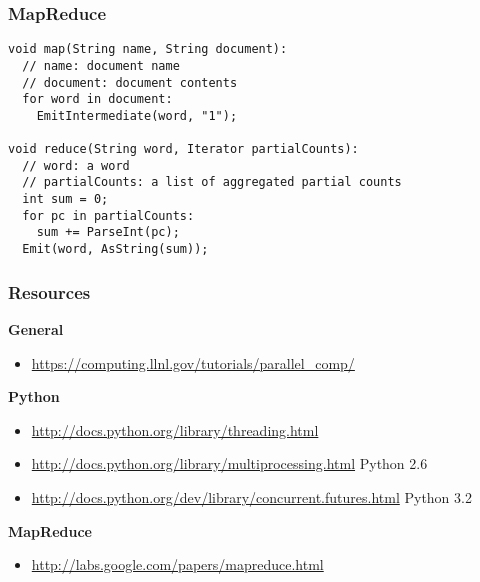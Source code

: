 \documentclass{beamer}
\begin{document}
\begin{frame}[fragile]
\frametitle{MapReduce}
\begin{verbatim}
void map(String name, String document):
  // name: document name
  // document: document contents
  for word in document:
    EmitIntermediate(word, "1");
 
void reduce(String word, Iterator partialCounts):
  // word: a word
  // partialCounts: a list of aggregated partial counts
  int sum = 0;
  for pc in partialCounts:
    sum += ParseInt(pc);
  Emit(word, AsString(sum));
\end{verbatim}
\end{frame}

\begin{frame}
\frametitle{Resources}
\textbf{General}
\begin{itemize}
  \item \url{https://computing.llnl.gov/tutorials/parallel_comp/}
\end{itemize}

\textbf{Python}
\begin{itemize}
  \item \url{http://docs.python.org/library/threading.html}
  \item \url{http://docs.python.org/library/multiprocessing.html} \tiny{Python 2.6}
  \item \url{http://docs.python.org/dev/library/concurrent.futures.html} \tiny{Python 3.2}
\end{itemize}
\textbf{MapReduce}
\begin{itemize}
  \item \url{http://labs.google.com/papers/mapreduce.html}
\end{itemize}
\end{frame}

\frame{\tableofcontents}

\frame{\titlepage}
\end{document}
